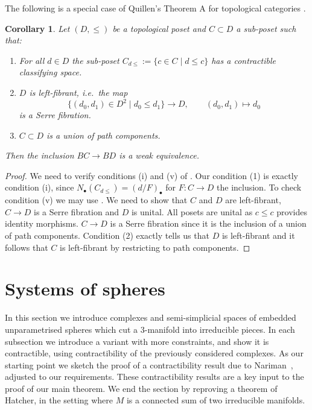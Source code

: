 \documentclass{amsart}
\theoremstyle{plain}
\newtheorem{cor}[thm]{Corollary}
\theoremstyle{definition}
\begin{document}
The following is a special case of Quillen's Theorem A for topological categories \cite[Theorem 4.8]{EbertRandalWilliams}.
\begin{cor}\label{cor:QuillenA}
    Let $(D, \le)$ be a topological poset and 
    $C \subset D$ a sub-poset such that:
    \begin{enumerate}
        \item For all $d \in D$ the sub-poset 
        $C_{d \le} := \{c \in C \;|\; d \le c\}$
        has a contractible classifying space.
        \item $D$ is left-fibrant, {i.e.}~the map
        \[
            \{(d_0, d_1) \in D^2 \;|\; d_0 \le d_1\} 
            \longrightarrow D, 
            \qquad
            (d_0, d_1) \longmapsto d_0
        \]
        is a Serre fibration.
        \item $C \subset D$ is a union of path components.
    \end{enumerate}
    Then the inclusion $BC \to BD$ is a weak equivalence.
\end{cor}
\begin{proof}
    We need to verify conditions (i) and (v) of \cite[Theorem 4.8]{EbertRandalWilliams}.
    Our condition (1) is exactly condition (i), since $N_\bullet(C_{d\le}) = (d/F)_\bullet$ for $F:C \to D$ the inclusion.
    To check condition (v) we may use \cite[Lemma 4.6.(vi)]{EbertRandalWilliams}.
    We need to show that $C$ and $D$ are left-fibrant, $C \to D$ is a Serre fibration and $D$ is unital.
    All posets are unital as $c \le c$ provides identity morphisms. 
    $C \to D$ is a Serre fibration since it is the inclusion of a union of path components.
    Condition (2) exactly tells us that $D$ is left-fibrant and it follows that $C$ is left-fibrant by restricting to path components.
\end{proof}

\section{Systems of spheres} \label{section: systems of spheres}
 In this section we introduce complexes and semi-simplicial spaces of embedded unparametrised spheres which cut a 3-manifold into irreducible pieces. In each subsection we introduce a variant with more constraints, and show it is contractible, using contractibility of the previously considered complexes. As our starting point we sketch the proof of a contractibility result due to Nariman~\cite{Nariman}, adjusted to our requirements. These contractibility results are a key input to the proof of our main theorem. We end the section by reproving a theorem of Hatcher, in the setting where $M$ is a connected sum of two irreducible manifolds.
 
\end{document}
